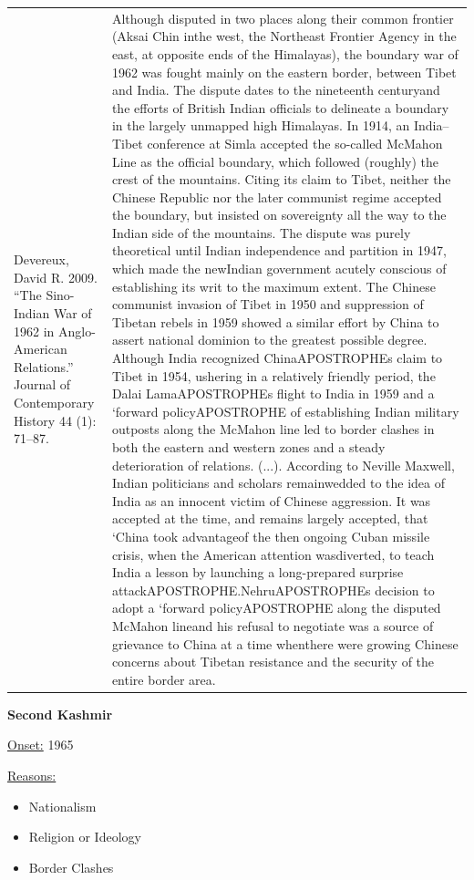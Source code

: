 {\begin{longtable}{p{}p{}}
Devereux, David R. 2009. “The Sino-Indian War of 1962 in Anglo-American Relations.” Journal of Contemporary History 44 (1): 71–87. & Although disputed in two places along their common frontier (Aksai Chin inthe west, the Northeast Frontier Agency in the east, at opposite ends of the Himalayas), the boundary war of 1962 was fought mainly on the eastern border, between Tibet and India. The dispute dates to the nineteenth centuryand the efforts of British Indian officials to delineate a boundary in the largely unmapped high Himalayas. In 1914, an India–Tibet conference at Simla accepted the so-called McMahon Line as the official boundary, which followed (roughly) the crest of the mountains. Citing its claim to Tibet, neither the Chinese Republic nor the later communist regime accepted the boundary, but insisted on sovereignty all the way to the Indian side of the mountains. The dispute was purely theoretical until Indian independence and partition in 1947, which made the newIndian government acutely conscious of establishing its writ to the maximum extent. The Chinese communist invasion of Tibet in 1950 and suppression of Tibetan rebels in 1959 showed a similar effort by China to assert national dominion to the greatest possible degree. Although India recognized ChinaAPOSTROPHEs claim to Tibet in 1954, ushering in a relatively friendly period, the Dalai LamaAPOSTROPHEs flight to India in 1959 and a ‘forward policyAPOSTROPHE of establishing Indian military outposts along the McMahon line led to border clashes in both the eastern and western zones and a steady deterioration of relations. (...).  
According to Neville Maxwell, Indian politicians and scholars remainwedded to the idea of India as an innocent victim of Chinese aggression. It was accepted at the time, and remains largely accepted, that ‘China took advantageof the then ongoing Cuban missile crisis, when the American attention wasdiverted, to teach India a lesson by launching a long-prepared surprise attackAPOSTROPHE.NehruAPOSTROPHEs decision to adopt a ‘forward policyAPOSTROPHE along the disputed McMahon lineand his refusal to negotiate was a source of grievance to China at a time whenthere were growing Chinese concerns about Tibetan resistance and the security of the entire border area.
\\
\end{longtable}}
\clearpage
         \textbf{Second Kashmir} 

          \underline{Onset:} 1965         

\underline{Reasons:}
\begin{itemize}
\item Nationalism
\item Religion or Ideology
\item Border Clashes
\end{itemize}

